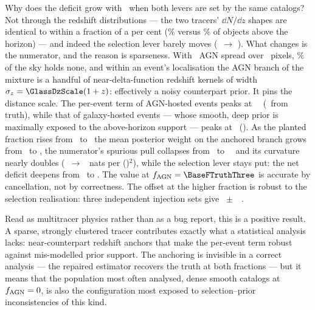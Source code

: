 Why does the deficit grow with \fagn\ when both levers are set by the same
catalogs? Not through the redshift distributions --- the two tracers'
$\dd N/\dd z$ shapes are identical to within a fraction of a per cent
(\TiltCatAboveGal\% versus \TiltCatAboveAgn\% of objects above the horizon)
--- and indeed the selection lever barely moves
(\BaseDecompShiftThree\ $\rightarrow$ \BaseDecompShiftSeven). What changes is
the numerator, and the reason is sparseness. With \GlassNagn\ AGN spread over
\GlassNpix\ pixels, \GlassAgnEmptyPix\% of the sky holds none, and within an
event's localisation the AGN branch of the mixture is a handful of
near-delta-function redshift kernels of width $\sigma_z = \GlassDzScale(1+z)$:
effectively a noisy counterpart prior. It pins the distance scale. The
per-event term of AGN-hosted events peaks at
\TiltNumAgnhostThree~\kmsmpc\ (\TiltNumAgnhostOffThree\ from truth), while
that of galaxy-hosted events --- whose smooth, deep prior is maximally exposed
to the above-horizon support --- peaks at \TiltNumGalhostThree\
(\TiltNumGalhostOffThree). As the planted fraction rises from
\BaseFTruthThree\ to \BaseFTruthSeven\ the mean posterior weight on the
anchored branch grows from \TiltAgnShareThree\ to \TiltAgnShareSeven, the
numerator's spurious pull collapses from \BaseDecompNumOffThree\ to
\BaseDecompNumOffSeven~\kmsmpc\ and its curvature nearly doubles
(\TiltCurvThree\ $\rightarrow$ \TiltCurvSeven\ nats per (\kmsmpc)$^2$), while
the selection lever stays put: the net deficit deepens from
\BaseJointHzeroOffThree\ to \BaseJointHzeroOffSeven. The value at
$\fagn = \BaseFTruthThree$ is accurate by cancellation, not by correctness.
The offset at the higher fraction is robust to the selection realisation:
three independent injection sets give \TiltInjSpreadMean~$\pm$~\TiltInjSpreadSd~\kmsmpc.

Read as multitracer physics rather than as a bug report, this is a positive
result. A sparse, strongly clustered tracer contributes exactly what a
statistical analysis lacks: near-counterpart redshift anchors that make the
per-event term robust against mis-modelled prior support. The anchoring is
invisible in a correct analysis --- the repaired estimator recovers the truth
at both fractions --- but it means that the population most often analysed,
dense smooth catalogs at $f_{\rm AGN} = 0$, is also the configuration most exposed
to selection--prior inconsistencies of this kind.
